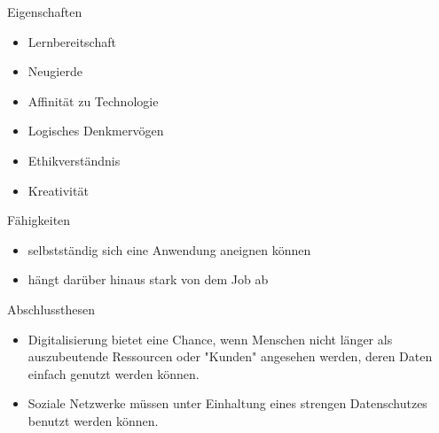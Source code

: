 \documentclass{beamer}
\begin{document}
\begin{frame}{Eigenschaften}
    \begin{itemize}
        \item Lernbereitschaft
        \vfill
        \item Neugierde
        \vfill
        \item Affinität zu Technologie
        \vfill
        \item Logisches Denkmervögen
        \vfill
        \item Ethikverständnis
        \vfill
        \item Kreativität
    \end{itemize}
\end{frame}

\begin{frame}{Fähigkeiten}
    \begin{itemize}
        \item selbstständig sich eine Anwendung aneignen können
        \vfill
        \item hängt darüber hinaus stark von dem Job ab
    \end{itemize}
\end{frame}

\begin{frame}{Abschlussthesen}
    \begin{itemize}
        \item Digitalisierung bietet eine Chance, wenn Menschen nicht länger als
              auszubeutende Ressourcen oder "Kunden" angesehen werden, deren
              Daten einfach genutzt werden können.
        \vfill
        \item Soziale Netzwerke müssen unter Einhaltung eines strengen
              Datenschutzes benutzt werden können.
    \end{itemize}
\end{frame}
\end{document}
